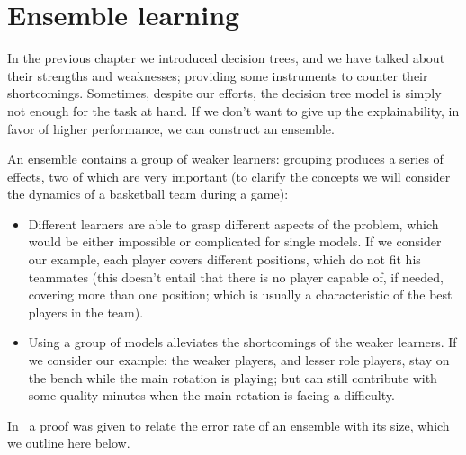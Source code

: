 \section{Ensemble learning}
\label{sec:el}
In the previous chapter we introduced decision trees, and we have talked about their
strengths and weaknesses; providing some instruments to counter their shortcomings. Sometimes,
despite our efforts, the decision tree model is simply not enough for the task at hand. If we don't
want to give up the explainability, in favor of higher performance, we can construct an ensemble.

An ensemble contains a group of weaker learners: grouping produces a series of effects, two of which are
very important (to clarify the concepts we will consider the dynamics of a basketball team during a
game):
\begin{itemize}
	\item Different learners are able to grasp different aspects of the problem, which would be
		either impossible or complicated for single models. If we consider our example, each
		player covers different positions, which do not fit his teammates (this doesn't
		entail that there is no player capable of, if needed, covering more than one
		position; which is usually a characteristic of the best players in the team).
	\item Using a group of models alleviates the shortcomings of the weaker learners. If we consider our example: the weaker players, and lesser role players, stay on the bench while the main rotation is playing; but can still contribute with some quality minutes when the main rotation is facing a difficulty.
\end{itemize}

In~\cite{ZhouZhi-Hua2021ML} a proof was given to relate the error rate of an ensemble with its size,
which we outline here below.

